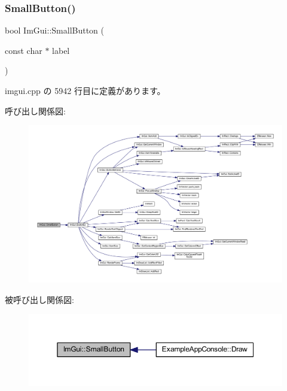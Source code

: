 \subsubsection{\texorpdfstring{Small\+Button()}{SmallButton()}}
{\footnotesize\ttfamily bool Im\+Gui\+::\+Small\+Button (\begin{DoxyParamCaption}\item[{const char $\ast$}]{label }\end{DoxyParamCaption})}



 imgui.\+cpp の 5942 行目に定義があります。

呼び出し関係図\+:\nopagebreak
\begin{figure}[H]
\begin{center}
\leavevmode
\includegraphics[width=350pt]{namespace_im_gui_a5b76ec69758aeb0a00a66f142f7a4fb2_cgraph}
\end{center}
\end{figure}
被呼び出し関係図\+:\nopagebreak
\begin{figure}[H]
\begin{center}
\leavevmode
\includegraphics[width=350pt]{namespace_im_gui_a5b76ec69758aeb0a00a66f142f7a4fb2_icgraph}
\end{center}
\end{figure}
\mbox{\label{namespace_im_gui_a2659e2bfe84b4cad0facd65d5c1ac90d}} 
